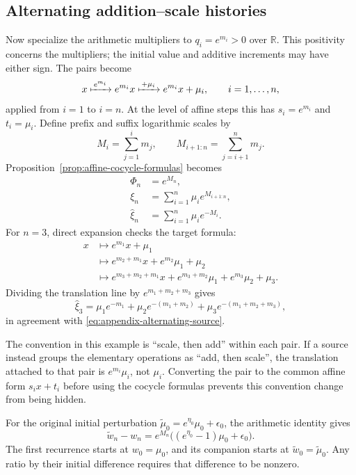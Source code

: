 \subsection{Alternating addition--scale histories}
\label{subsec:appendix-alternating-logarithmic}

Now specialize the arithmetic multipliers to $q_i=e^{m_i}>0$ over
$\mathbb R$.  This positivity concerns the multipliers; the initial value
and additive increments may have either sign.  The pairs become
\[
  x\xmapsto{\,e^{m_i}\,}e^{m_i}x
  \xmapsto{\,+\mu_i\,}e^{m_i}x+\mu_i,
  \qquad i=1,\ldots,n,
\]
applied from $i=1$ to $i=n$.  At the level of affine steps this has
$s_i=e^{m_i}$ and $t_i=\mu_i$.  Define prefix and suffix logarithmic
scales by
\[
  M_i=\sum_{j=1}^{i}m_j,
  \qquad
  M_{i+1:n}=\sum_{j=i+1}^{n}m_j.
\]
Proposition~\ref{prop:affine-cocycle-formulas} becomes
\begin{align}
  \Phi_n&=e^{M_n},
  \label{eq:appendix-alternating-scale}\\
  \xi_n&=\sum_{i=1}^{n}\mu_i e^{M_{i+1:n}},
  \label{eq:appendix-alternating-target}\\
  \widehat\xi_n&=\sum_{i=1}^{n}\mu_i e^{-M_i}.
  \label{eq:appendix-alternating-source}
\end{align}
For $n=3$, direct expansion checks the target formula:
\begin{align*}
  x
  &\longmapsto e^{m_1}x+\mu_1\\
  &\longmapsto e^{m_2+m_1}x
      +e^{m_2}\mu_1+\mu_2\\
  &\longmapsto e^{m_3+m_2+m_1}x
      +e^{m_3+m_2}\mu_1
      +e^{m_3}\mu_2+\mu_3.
\end{align*}
Dividing the translation line by
$e^{m_1+m_2+m_3}$ gives
\[
  \widehat\xi_3
  =\mu_1e^{-m_1}
   +\mu_2e^{-(m_1+m_2)}
   +\mu_3e^{-(m_1+m_2+m_3)},
\]
in agreement with \eqref{eq:appendix-alternating-source}.

The convention in this example is ``scale, then add'' within each pair.  If a
source instead groups the elementary operations as ``add, then scale'', the
translation attached to that pair is $e^{m_i}\mu_i$, not $\mu_i$.
Converting the pair to the common affine form $s_ix+t_i$ before using the
cocycle formulas prevents this convention change from being hidden.

For the original initial perturbation
$\widetilde\mu_0=e^{\eta_0}\mu_0+\epsilon_0$, the arithmetic identity gives
\[
  \widetilde w_n-w_n
   =e^{M_n}\bigl((e^{\eta_0}-1)\mu_0+\epsilon_0\bigr).
\]
The first recurrence starts at $w_0=\mu_0$, and its companion starts at
$\widetilde w_0=\widetilde\mu_0$.  Any ratio by their initial difference
requires that difference to be nonzero.

